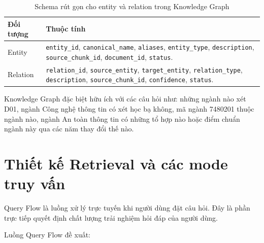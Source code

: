 \begin{table}[H]
\centering
\begin{tabular}{|p{3.8cm}|p{9cm}|}
\hline
\textbf{Đối tượng} & \textbf{Thuộc tính} \\
\hline
Entity & \texttt{entity\_id}, \texttt{canonical\_name}, \texttt{aliases}, \texttt{entity\_type}, \texttt{description}, \texttt{source\_chunk\_id}, \texttt{document\_id}, \texttt{status}. \\
\hline
Relation & \texttt{relation\_id}, \texttt{source\_entity}, \texttt{target\_entity}, \texttt{relation\_type}, \texttt{description}, \texttt{source\_chunk\_id}, \texttt{confidence}, \texttt{status}. \\
\hline
\end{tabular}
\caption{Schema rút gọn cho entity và relation trong Knowledge Graph}
\label{tab:rag-kg-schema}
\end{table}

Knowledge Graph đặc biệt hữu ích với các câu hỏi như: những ngành nào xét D01, ngành Công nghệ thông tin có xét học bạ không, mã ngành 7480201 thuộc ngành nào, ngành An toàn thông tin có những tổ hợp nào hoặc điểm chuẩn ngành này qua các năm thay đổi thế nào.

\section{Thiết kế Retrieval và các mode truy vấn}

Query Flow là luồng xử lý trực tuyến khi người dùng đặt câu hỏi. Đây là phần trực tiếp quyết định chất lượng trải nghiệm hỏi đáp của người dùng.

Luồng Query Flow đề xuất:


